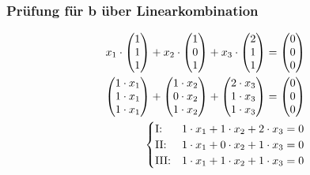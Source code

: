 \subsubsection{Prüfung für b über Linearkombination}
\begin{align*}
    x_1 \cdot \begin{pmatrix}
        1 \\ 1 \\ 1
    \end{pmatrix} + x_2 \cdot \begin{pmatrix}
        1 \\ 0 \\ 1
    \end{pmatrix} + x_3 \cdot \begin{pmatrix}
        2 \\ 1 \\ 1
    \end{pmatrix} = \begin{pmatrix}
        0 \\ 0 \\ 0
    \end{pmatrix} \\
    \begin{pmatrix}
        1 \cdot x_1 \\ 1 \cdot x_1 \\ 1 \cdot x_1
    \end{pmatrix} + \begin{pmatrix}
        1 \cdot x_2\\ 0 \cdot x_2 \\ 1 \cdot x_2
    \end{pmatrix} + \begin{pmatrix}
        2 \cdot x_3 \\ 1 \cdot x_3 \\ 1 \cdot x_3
    \end{pmatrix} = \begin{pmatrix}
        0 \\ 0 \\ 0
    \end{pmatrix} \\
    \begin{cases}
       \text{I:\@} & 1 \cdot x_1 + 1 \cdot x_2 + 2 \cdot x_3 = 0 \\
       \text{II:\@} & 1 \cdot x_1 + 0 \cdot x_2 + 1 \cdot x_3 = 0 \\
       \text{III:\@} & 1 \cdot x_1 + 1 \cdot x_2 + 1 \cdot x_3 = 0
    \end{cases} \\

\end{align*}
